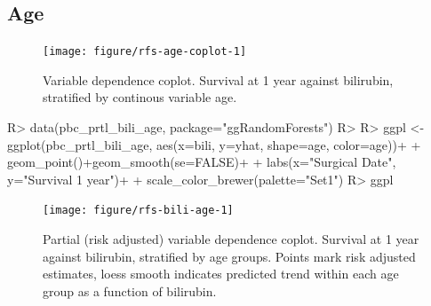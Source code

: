\documentclass[nojss]{jss}\usepackage[]{graphicx}\usepackage[]{color}
\begin{document}
\subsection{Age}
\begin{Schunk}
\begin{figure}[!htpb]

{\centering \texttt{[image: figure/rfs-age-coplot-1]} 

}

\caption[Variable dependence coplot]{Variable dependence coplot. Survival at 1 year against bilirubin, stratified by continous variable age.\label{fig:age-coplot}}
\end{figure}
\end{Schunk}

\begin{Schunk}
\begin{Sinput}
R> data(pbc_prtl_bili_age, package="ggRandomForests")
R> 
R> ggpl <- ggplot(pbc_prtl_bili_age, aes(x=bili, y=yhat, shape=age, color=age))+
+   geom_point()+geom_smooth(se=FALSE)+
+   labs(x="Surgical Date", y="Survival 1 year")+
+   scale_color_brewer(palette="Set1")
R> ggpl
\end{Sinput}
\begin{figure}[!htpb]

{\centering \texttt{[image: figure/rfs-bili-age-1]} 

}

\caption[Partial (risk adjusted) variable dependence coplot]{Partial (risk adjusted) variable dependence coplot. Survival at 1 year against bilirubin, stratified by age groups. Points mark risk adjusted estimates, loess smooth indicates predicted trend within each age group as a function of bilirubin.\label{fig:bili-age}}
\end{figure}
\end{Schunk}
\end{document}
